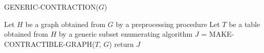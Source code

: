 \begin{algorithm}[H] 
    \caption{GENERIC-CONTRACTION($G$)}\label{alg:generic-contraction}
    \begin{algorithmic}[1]
        \State Let $H$ be a graph obtained from $G$ by a preprocessing procedure
        \State Let $T$ be a table obtained from $H$ by a generic subset enumerating algorithm
        \State $J$ = MAKE-CONTRACTIBLE-GRAPH($T$, $G$)
        \State return $J$
    \end{algorithmic}
\end{algorithm}
